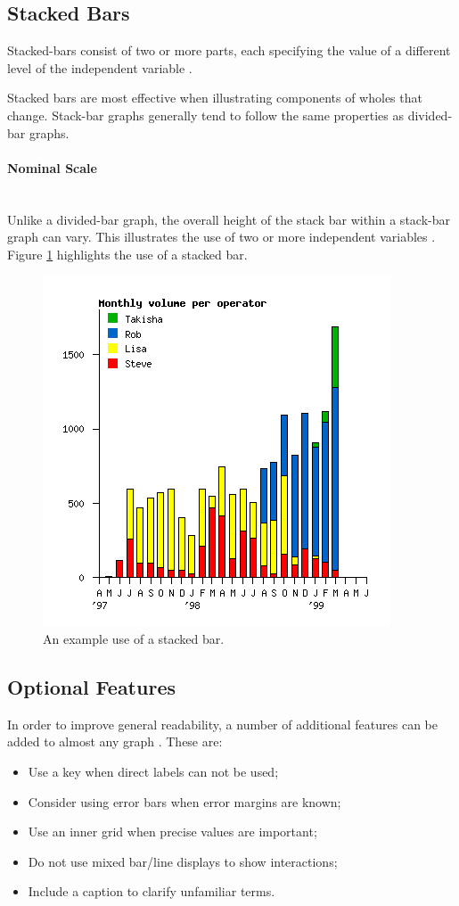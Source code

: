 \subsection{Stacked Bars}
Stacked-bars consist of two or more parts, each specifying the value of a 
different level of the independent variable \citep{kosslyn06}. 

Stacked bars are most effective when illustrating components of wholes that 
change. Stack-bar graphs generally tend to follow the same properties as 
divided-bar graphs.

\paragraph{Nominal Scale} ~\\
Unlike a divided-bar graph, the overall height of the stack bar within a 
stack-bar graph can vary. This illustrates the use of two or more independent 
variables \citep{kosslyn06}. Figure \ref{fig:stacked_bars} highlights the use
of a stacked bar.

\begin{figure}[H]
  \centering
    \includegraphics[scale=1]{chapter3/visualisation/stacked_bars.png}
  \caption{An example use of a stacked bar.}
  \label{fig:stacked_bars}
\end{figure}


\subsection{Optional Features}
In order to improve general readability, a number of additional features can be
added to almost any graph \citep{kosslyn06}. These are:
\begin{itemize}
  \item Use a key when direct labels can not be used;
  \item Consider using error bars when error margins are known;
  \item Use an inner grid when precise values are important;
  \item Do not use mixed bar/line displays to show interactions;
  \item Include a caption to clarify unfamiliar terms.
\end{itemize}
